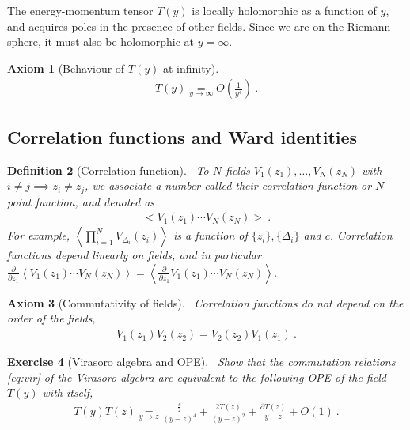 \documentclass[12pt, a4paper]{article}
\theoremstyle{break}
\newtheorem{exo}{Exercise}[section]
\newtheorem{hyp}[exo]{Axiom}
\newtheorem{defn}[exo]{Definition}
\begin{document}
The energy-momentum tensor $T(y)$ is locally holomorphic as a function of $y$, and acquires poles in the presence of other fields. Since we are on the Riemann sphere, it must also be holomorphic at $y=\infty$. 

\begin{hyp}[Behaviour of $T(y)$ at infinity]
~\label{hyp:ti}
 \begin{align}
 T(y) \underset{y\to\infty} = O\left(\frac{1}{y^4}\right)\ .
 \label{eq:tinf}
\end{align}
\end{hyp}


\subsection{Correlation functions and Ward identities}

\begin{defn}[Correlation function]
~\label{def:cor}
 To $N$ fields $V_1(z_1), \dots ,V_N(z_N)$ with $i\neq j\implies z_i\neq z_j$, we associate a number called their correlation function or $N$-point function, and denoted as 
 \begin{align}
  \Big< V_1(z_1) \cdots V_N(z_N) \Big>\ .
 \end{align}
For example, $\left< \prod_{i=1}^N V_{\Delta_i}(z_i) \right>$ is a function of $\{z_i\}, \{\Delta_i\}$ and $c$.
Correlation functions depend linearly on fields, and in particular $\frac{\partial}{\partial z_1} \left< V_1(z_1) \cdots V_N(z_N) \right> = \left< \frac{\partial}{\partial z_1}V_1(z_1) \cdots V_N(z_N) \right>$.
\end{defn}

\begin{hyp}[Commutativity of fields]
 ~\label{hyp:ass}
 Correlation functions do not depend on the order of the fields,
 \begin{align}
  V_1(z_1) V_2(z_2) = V_2(z_2)V_1(z_1)\ .
 \end{align}
\end{hyp}

\begin{exo}[Virasoro algebra and OPE] 
~\label{exott}
Show that the commutation relations \eqref{eq:vir} of the Virasoro algebra are equivalent to the following OPE of the field $T(y)$ with itself,
\begin{align}
 T(y)T(z) \underset{y\to z}{=} \frac{\frac{c}{2}}{(y-z)^4} + \frac{2T(z)}{(y-z)^2} + \frac{\partial T(z)}{y-z} + O(1)\ .
\label{tt}
\end{align}
\end{exo}
\end{document}
